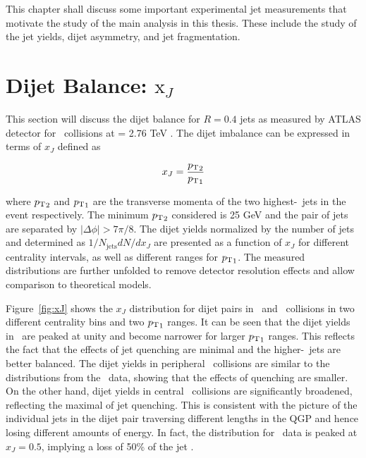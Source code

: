 This chapter shall discuss some important experimental jet measurements that motivate the study of the main analysis in this thesis. These include the study of the jet yields, dijet asymmetry, and jet fragmentation. 


\section{Dijet Balance: $\mathrm{x}_{J}$}
\label{sec:xj}
This section will discuss the dijet balance for $R = 0.4$ jets as measured by ATLAS detector for \pbpb\ collisions at \sqrtsnn = 2.76 TeV \cite{Aaboud:2017eww}. The dijet imbalance can be expressed in terms of $x_J$ defined as

\begin{align}
x_J =  \frac{\mbox{$p_{\mathrm{T}}$}_2}{\mbox{$p_{\mathrm{T}}$}_1}
\end{align}

where $\mbox{$p_{\mathrm{T}}$}_2$ and $\mbox{$p_{\mathrm{T}}$}_1$ are the transverse momenta of the two highest-\pt\ jets in the event respectively. The minimum $\mbox{$p_{\mathrm{T}}$}_2$ considered is 25 GeV and the pair of jets are separated by $|\Delta\phi| > 7\pi/8$. The dijet yields normalized by the number of jets and determined as $1/N_\mathrm{jets} dN/dx_J$ are presented as a function of $x_J$ for different centrality intervals, as well as different ranges for $\mbox{$p_{\mathrm{T}}$}_1$. The measured distributions are further unfolded to remove detector resolution effects and allow comparison to theoretical models.

Figure~\ref{fig:xJ} shows the $x_J$ distribution for dijet pairs in \pp\ and \pbpb\ collisions in two different centrality bins and two $\mbox{$p_{\mathrm{T}}$}_1$ ranges. It can be seen that the dijet yields in \pp\ are peaked at unity and become narrower for larger $\mbox{$p_{\mathrm{T}}$}_1$ ranges. This reflects the fact that the effects of jet quenching are minimal and the higher-\pt\ jets are better balanced. The dijet yields in peripheral \pbpb\ collisions are similar to the distributions from the \pp\ data, showing that the effects of quenching are smaller. On the other hand, dijet yields in central \pbpb\ collisions are significantly broadened, reflecting the maximal  of jet quenching. This is consistent with the picture of the individual jets in the dijet pair traversing different lengths in the QGP and hence losing different amounts of energy. In fact, the distribution for \pbpb\ data is peaked at $x_J = 0.5$, implying a loss of 50\% of the jet \pt.

